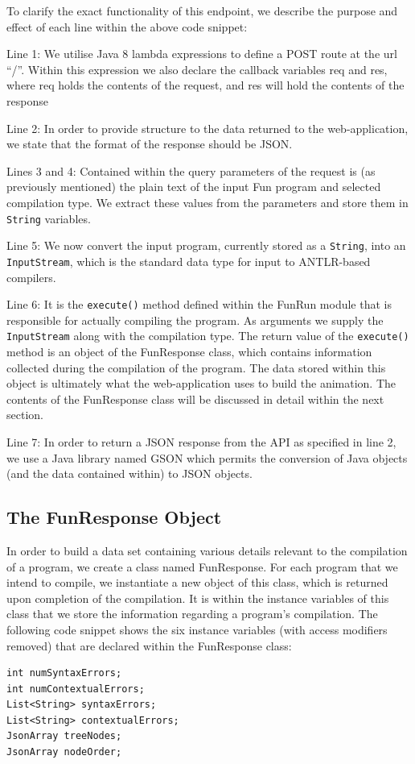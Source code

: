 \documentclass{l4proj}
\begin{document}
To clarify the exact functionality of this endpoint, we describe the purpose and effect of each line within the above code snippet:
\begin{description}
\item Line 1: We utilise Java 8 lambda expressions to define a POST route at the url ``/''. Within this expression we also declare the callback variables req and res, where req holds the contents of the request, and res will hold the contents of the response
\item Line 2: In order to provide structure to the data returned to the web-application, we state that the format of the response should be JSON.
\item Lines 3 and 4: Contained within the query parameters of the request is (as previously mentioned) the plain text of the input Fun program and selected compilation type. We extract these values from the parameters and store them in \texttt{String} variables.
\item Line 5: We now convert the input program, currently stored as a \texttt{String}, into an \texttt{InputStream}, which is the standard data type for input to ANTLR-based compilers.
\item Line 6: It is the \texttt{execute()} method defined within the FunRun module that is responsible for actually compiling the program. As arguments we supply the \texttt{InputStream} along with the compilation type. The return value of the \texttt{execute()} method is an object of the FunResponse class, which contains information collected during the compilation of the program. The data stored within this object is ultimately what the web-application uses to build the animation. The contents of the FunResponse class will be discussed in detail within the next section.
\item Line 7: In order to return a JSON response from the API as specified in line 2, we use a Java library named GSON which permits the conversion of Java objects (and the data contained within) to JSON objects.
\end{description}

\subsection{The FunResponse Object}
In order to build a data set containing various details relevant to the compilation of a program, we create a class named FunResponse. For each program that we intend to compile, we instantiate a new object of this class, which is returned upon completion of the compilation. It is within the instance variables of this class that we store the information regarding a program's compilation. The following code snippet shows the six instance variables (with access modifiers removed) that are declared within the FunResponse class:
\begin{lstlisting}
int numSyntaxErrors;
int numContextualErrors;
List<String> syntaxErrors;
List<String> contextualErrors;
JsonArray treeNodes;
JsonArray nodeOrder;
\end{lstlisting}
\end{document}
